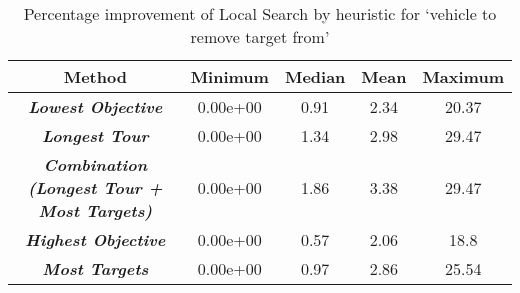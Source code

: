 \begin{table}[htb!]
	\centering
	\begin{tabular}{|c|c|c|c|c|}
	\hline
	\textbf{Method} & \textbf{Minimum} & \textbf{Median} & \textbf{Mean} & \textbf{Maximum} \\\hline
	\textit\textbf{{Lowest Objective}} & 0.00e+00 & 0.91 & 2.34 & 20.37\\\hline
	\textit\textbf{{Longest Tour}} & 0.00e+00 & 1.34 & 2.98 & 29.47\\\hline
	\textit\textbf{{Combination (Longest Tour + Most Targets)}} & 0.00e+00 & 1.86 & 3.38 & 29.47\\\hline
	\textit\textbf{{Highest Objective}} & 0.00e+00 & 0.57 & 2.06 & 18.8\\\hline
	\textit\textbf{{Most Targets}} & 0.00e+00 & 0.97 & 2.86 & 25.54\\\hline
	\end{tabular}
\caption{Percentage improvement of Local Search by heuristic for \lq vehicle to remove target from\rq}
\label{tab:percentage_improvement}
\end{table}